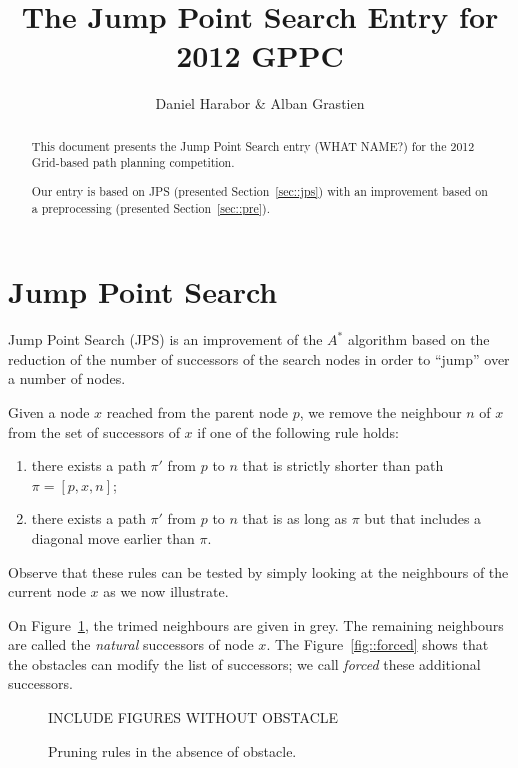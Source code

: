 \documentclass{article}
\begin{document}
\title{The Jump Point Search Entry for 2012 GPPC}
\author{Daniel Harabor \& Alban Grastien}
\maketitle


\begin{abstract}
  This document presents the Jump Point Search entry (WHAT NAME?) 
  for the 2012 Grid-based path planning competition.  

  Our entry is based on JPS \cite{harabor11b} 
  (presented Section~\ref{sec::jps}) 
  with an improvement based on a preprocessing 
  (presented Section~\ref{sec::pre}).  
\end{abstract}

\section{Jump Point Search}
\label{sec::jps}

Jump Point Search (JPS) is an improvement of the $A^*$ algorithm 
based on the reduction of the number of successors of the search nodes 
in order to ``jump'' over a number of nodes.  

Given a node $x$ reached from the parent node $p$, 
we remove the neighbour $n$ of $x$ 
from the set of successors of $x$ 
if one of the following rule holds: 
\begin{enumerate}
\item 
  there exists a path $\pi'$ from $p$ to $n$ 
  that is strictly shorter than path $\pi = [p,x,n]$; 
\item 
  there exists a path $\pi'$ from $p$ to $n$ 
  that is as long as $\pi$ but that includes a diagonal move earlier than $\pi$.  
\end{enumerate}
Observe that these rules can be tested by simply looking 
at the neighbours of the current node $x$ 
as we now illustrate.  

On Figure~\ref{fig::pruning}, 
the trimed neighbours are given in grey.  
The remaining neighbours are called the \emph{natural} successors of node $x$.  
The Figure~\ref{fig::forced} shows 
that the obstacles can modify the list of successors; 
we call \emph{forced} these additional successors.  

\begin{figure}[ht]
  INCLUDE FIGURES WITHOUT OBSTACLE
  \caption{Pruning rules in the absence of obstacle.}
  \label{fig::pruning}
\end{figure}
\end{document}
